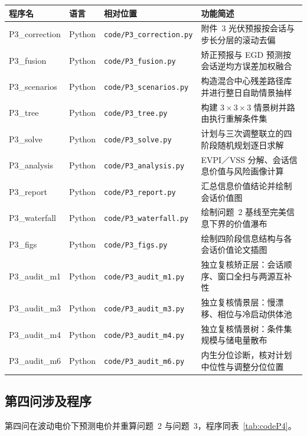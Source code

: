 \documentclass[zihao=-4,a4paper,fontset=none]{ctexart}
\begin{document}
\noindent\begin{minipage}{\textwidth}
\centering
{}\label{tab:codeP3}
{\footnotesize
\begin{tabular}{@{}p{2.4cm}p{0.9cm}p{3.7cm}p{6.4cm}@{}}
\toprule
程序名 & 语言 & 相对位置 & 功能简述 \\
\midrule
P3\_correction & Python & \texttt{code/P3\_correction.py} & 附件~3 光伏预报按会话与步长分层的滚动去偏 \\
P3\_fusion & Python & \texttt{code/P3\_fusion.py} & 矫正预报与 EGD 预测按会话逆均方误差加权融合 \\
P3\_scenarios & Python & \texttt{code/P3\_scenarios.py} & 构造混合中心残差路径库并进行整日自助情景抽样 \\
P3\_tree & Python & \texttt{code/P3\_tree.py} & 构建 $3\times3\times3$ 情景树并路由执行重解条件集 \\
P3\_solve & Python & \texttt{code/P3\_solve.py} & 计划与三次调整联立的四阶段随机规划逐日求解 \\
P3\_analysis & Python & \texttt{code/P3\_analysis.py} & EVPI／VSS 分解、会话信息价值与风险画像计算 \\
P3\_report & Python & \texttt{code/P3\_report.py} & 汇总信息价值结论并绘制会话价值图 \\
P3\_waterfall & Python & \texttt{code/P3\_waterfall.py} & 绘制问题~2 基线至完美信息下界的价值瀑布 \\
P3\_figs & Python & \texttt{code/P3\_figs.py} & 绘制四阶段信息结构与各会话价值论文插图 \\
P3\_audit\_m1 & Python & \texttt{code/P3\_audit\_m1.py} & 独立复核矫正层：会话顺序、窗口全扫与两源互补性 \\
P3\_audit\_m3 & Python & \texttt{code/P3\_audit\_m3.py} & 独立复核情景层：慢漂移、相位与冷启动供体池 \\
P3\_audit\_m4 & Python & \texttt{code/P3\_audit\_m4.py} & 独立复核情景树：条件集规模与储电量散布 \\
P3\_audit\_m6 & Python & \texttt{code/P3\_audit\_m6.py} & 内生分位诊断，核对计划中位性与调整分位位置 \\
\bottomrule
\end{tabular}}
\end{minipage}

\subsection{第四问涉及程序}

第四问在波动电价下预测电价并重算问题~2 与问题~3，程序同表~\ref{tab:codeP4}。
\end{document}
